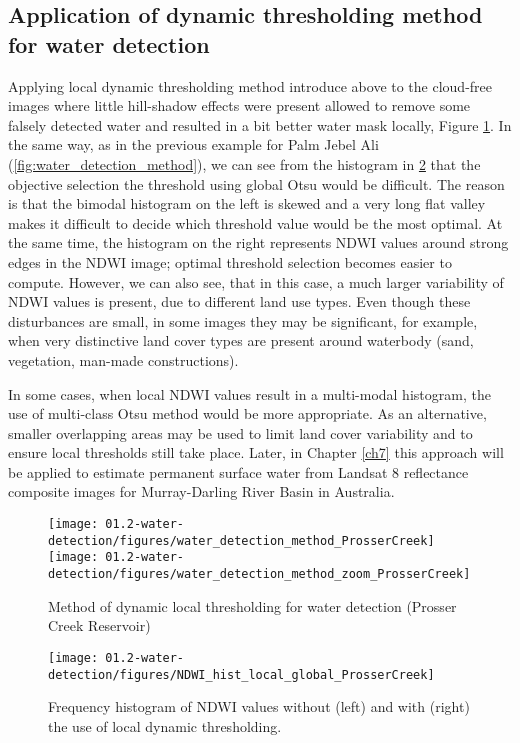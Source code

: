 \subsection{Application of dynamic thresholding method for water detection}

Applying local dynamic thresholding method introduce above to the cloud-free images where little hill-shadow effects were present allowed to remove some falsely detected water and resulted in a bit better water mask locally, Figure \ref{fig:water_detection_method_PC}. In the same way, as in the previous example for Palm Jebel Ali (\ref{fig:water_detection_method}), we can see from the histogram in \ref{fig:water_detection_method_local_water_hist_PC} that the objective selection the threshold using global Otsu would be difficult. The reason is that the bimodal histogram on the left is skewed and a very long flat valley makes it difficult to decide which threshold value would be the most optimal. At the same time, the histogram on the right represents NDWI values around strong edges in the NDWI image; optimal threshold selection becomes easier to compute. However, we can also see, that in this case, a much larger variability of NDWI values is present, due to different land use types. Even though these disturbances are small, in some images they may be significant, for example, when very distinctive land cover types are present around waterbody (sand, vegetation, man-made constructions). 

In some cases, when local NDWI values result in a multi-modal histogram, the use of multi-class Otsu method would be more appropriate. As an alternative, smaller overlapping areas may be used to limit land cover variability and to ensure local thresholds still take place. Later, in Chapter \ref{ch7} this approach will be applied to estimate permanent surface water from Landsat 8 reflectance composite images for Murray-Darling River Basin in Australia. 

\begin{figure}[H]
	\centering
	\texttt{[image: 01.2-water-detection/figures/water\_detection\_method\_ProsserCreek]}
	\texttt{[image: 01.2-water-detection/figures/water\_detection\_method\_zoom\_ProsserCreek]}
	\caption{Method of dynamic local thresholding for water detection (Prosser Creek Reservoir)}
	\label{fig:water_detection_method_PC}
\end{figure}

\begin{figure}[H]
	\centering
	\texttt{[image: 01.2-water-detection/figures/NDWI\_hist\_local\_global\_ProsserCreek]}
	\caption{Frequency histogram of NDWI values without (left) and with (right) the use of local dynamic thresholding.}
	\label{fig:water_detection_method_local_water_hist_PC}
\end{figure}

